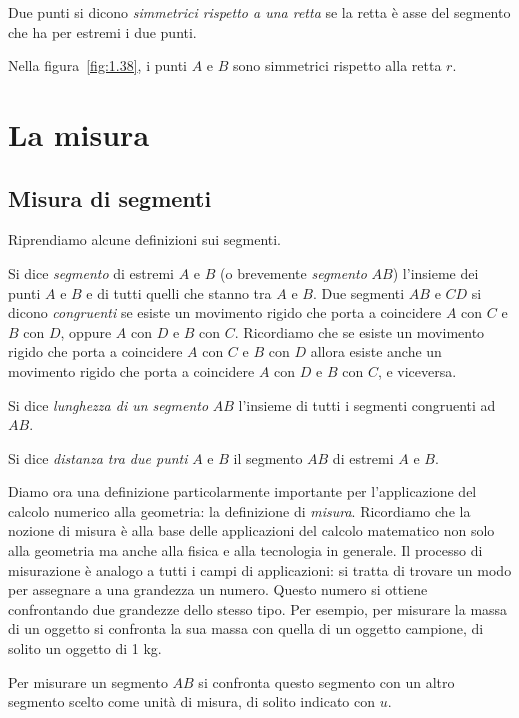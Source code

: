\begin{definizione}
Due punti si dicono \emph{simmetrici rispetto a una retta} se la retta è asse del segmento che ha per estremi i due punti.
\end{definizione}

Nella figura~\ref{fig:1.38}, i punti $A$ e $B$ sono simmetrici rispetto alla retta $r$.

\section{La misura}

\subsection{Misura di segmenti}

Riprendiamo alcune definizioni sui segmenti.

Si dice \emph{segmento} di estremi $A$ e $B$ (o brevemente \emph{segmento} $AB$) l'insieme dei punti $A$ e $B$ e di tutti quelli che stanno tra $A$ e $B$.
Due segmenti $AB$ e $CD$ si dicono \emph{congruenti} se esiste un movimento rigido che porta a coincidere $A$ con $C$ e $B$ con $D$, oppure $A$ con $D$ e $B$ con $C$. Ricordiamo che se esiste un movimento rigido che porta a coincidere $A$ con $C$ e $B$ con $D$ allora esiste anche un movimento rigido che porta a coincidere $A$ con $D$ e $B$ con $C$, e viceversa.

Si dice \emph{lunghezza di un segmento} $AB$ l'insieme di tutti i segmenti congruenti ad $AB$.

Si dice \emph{distanza tra due punti} $A$ e $B$ il segmento $AB$ di estremi $A$ e $B$.

Diamo ora una definizione particolarmente importante per l'applicazione del calcolo numerico alla geometria: la definizione di \emph{misura}. Ricordiamo che la nozione di misura è alla base delle applicazioni del calcolo matematico non solo alla geometria ma anche alla fisica e alla tecnologia in generale. Il processo di misurazione è analogo a tutti i campi di applicazioni: si tratta di trovare un modo per assegnare a una grandezza un numero. Questo numero si ottiene confrontando due grandezze dello stesso tipo. Per esempio, per misurare la massa di un oggetto si confronta la sua massa con quella di un oggetto campione, di solito un oggetto di 1 kg.

Per misurare un segmento $AB$ si confronta questo segmento con un altro segmento scelto come unità di misura, di solito indicato con $u$.

